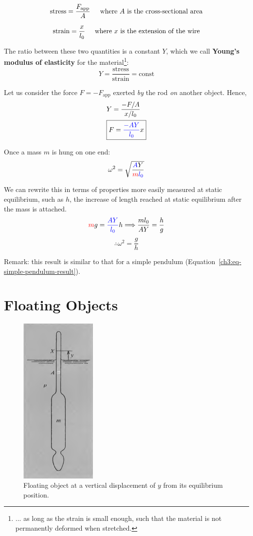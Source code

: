 \documentclass[11pt,letterpaper,titlepage,oneside]{book}
\newcommand{\htab}{\hspace{0.5cm}}
\newcommand{\where}{\htab\text{where }}
\newcommand{\kcol}[1]{\textcolor{blue}{#1}}
\newcommand{\mcol}[1]{\textcolor{red}{#1}}
\begin{document}
\[ \text{stress} = \frac{F_\text{app}}{A} \where\text{$A$ is the cross-sectional area} \]

\[  \text{strain} = \frac{x}{l_0} \where\text{$x$ is the extension of the wire}  \]

The ratio between these two quantities is a constant $Y$, which we call \textbf{Young's modulus of elasticity} for the material\footnote{... as long as the strain is small enough, such that the material is not permanently deformed when stretched.}:
\begin{equation}
	\boxed{ Y = \frac{\text{stress}}{\text{strain}} = \text{const}} \label{ch3:eq-Youngs-Modulus}
\end{equation}

Let us consider the force $F = -F_\text{app}$ exerted \emph{by} the rod \emph{on} another object. Hence,
\begin{align}
	& Y = \frac{-F/A}{x/l_0} \notag \\
	& \boxed{F = \kcol{\frac{-AY}{l_0}} x } \label{ch3:eq-Youngs-F}
\end{align}


Once a mass $m$ is hung on one end:
\[ \omega^2 = \sqrt{\frac{\kcol AY}{\mcol m \kcol{l_0}}} \]

We can rewrite this in terms of properties more easily measured at static equilibrium, such as $h$, the increase of length reached at static equilibrium after the mass is attached.
\[ \mcol{m}g=\kcol{\frac{AY}{l_0}} h \Longrightarrow \frac{ml_0}{AY}=\frac{h}{g} \]
\begin{equation}
\therefore \omega^2 = \frac{g}{h}  \label{ch3:eq-elastic-wire-result}
\end{equation} 

Remark: this result is similar to that for a simple pendulum (Equation~\ref{ch3:eq-simple-pendulum-result}).

\section{Floating Objects} \label{ch3:sec-floating}

\begin{figure}[h]
	\centering
	\includegraphics[scale=0.6]{phys232/Ch3-floating.png} \caption{Floating object at a vertical displacement of $y$ from its equilibrium position.}\label{ch3:fig-floating}
\end{figure}
\end{document}
